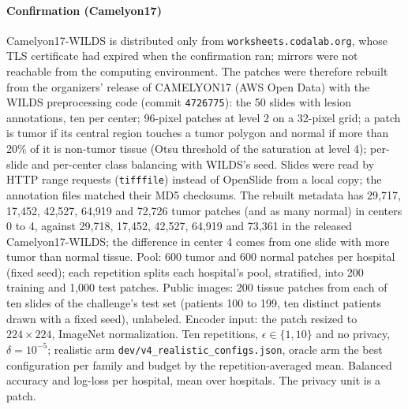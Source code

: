 \documentclass[acmsmall,screen,nonacm]{acmart}
\theoremstyle{acmdefinition}
\begin{document}
\paragraph{Confirmation (Camelyon17)} Camelyon17-WILDS \cite{koh2021wilds} is distributed only from \texttt{worksheets.codalab.org}, whose TLS certificate had expired when the confirmation ran; mirrors were not reachable from the computing environment. The patches were therefore rebuilt from the organizers' release of CAMELYON17 \cite{bandi2019camelyon17} (AWS Open Data) with the WILDS preprocessing code (commit \texttt{4726775}): the 50 slides with lesion annotations, ten per center; 96-pixel patches at level 2 on a 32-pixel grid; a patch is tumor if its central region touches a tumor polygon and normal if more than 20\% of it is non-tumor tissue (Otsu threshold of the saturation at level 4); per-slide and per-center class balancing with WILDS's seed. Slides were read by HTTP range requests (\texttt{tifffile}) instead of OpenSlide from a local copy; the annotation files matched their MD5 checksums. The rebuilt metadata has 29,717, 17,452, 42,527, 64,919 and 72,726 tumor patches (and as many normal) in centers 0 to 4, against 29,718, 17,452, 42,527, 64,919 and 73,361 in the released Camelyon17-WILDS; the difference in center 4 comes from one slide with more tumor than normal tissue. Pool: 600 tumor and 600 normal patches per hospital (fixed seed); each repetition splits each hospital's pool, stratified, into 200 training and 1,000 test patches. Public images: 200 tissue patches from each of ten slides of the challenge's test set (patients 100 to 199, ten distinct patients drawn with a fixed seed), unlabeled. Encoder input: the patch resized to $224\times224$, ImageNet normalization. Ten repetitions, $\epsilon\in\{1,10\}$ and no privacy, $\delta=10^{-5}$; realistic arm \texttt{dev/v4\_realistic\_configs.json}, oracle arm the best configuration per family and budget by the repetition-averaged mean. Balanced accuracy and log-loss per hospital, mean over hospitals. The privacy unit is a patch.

\begin{table}[ht]
\centering
\caption{Camelyon17 (pre-registered confirmation): balanced accuracy (higher is better) and log-loss of the logit-adjusted probabilities (lower is better), mean over five hospitals and \SimCamReps{} repetitions. Bold: the best per column among methods that use other hospitals, oracle excluded. $\dagger$: not private. $\star$: best of the six methods on the test patches. pFedMe's correctly calibrated noise makes it diverge at $\epsilon\in\{1,10\}$.}
\label{tab:camelyon}
\end{table}
\end{document}

